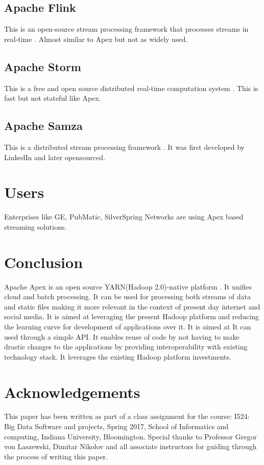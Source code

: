 \documentclass[9pt,twocolumn,twoside]{../../styles/osajnl}
\begin{document}
\subsection{Apache Flink}
This is an open-source stream processing framework that processes streams in real-time \cite{www-apacheapexflink}. Almost similar to Apex but not as widely used.
\subsection{Apache Storm}
This is a free and open source distributed real-time computation system \cite{www-apachestormsite}. This is fast but not stateful like Apex.
\subsection{Apache Samza}
This is a distributed stream processing framework \cite{www-apachesamzasite}. It was first developed by LinkedIn and later opensourced.
\section{Users}
Enterprises like GE, PubMatic, SilverSpring Networks are using Apex based streaming solutions. 
\section{Conclusion}
Apache Apex is an open source YARN(Hadoop 2.0)-native platform \cite{www-apacheapexwiki}. It unifies cloud and batch processing. It can be used for processing both streams of data and static files making it more relevant in the context of present day internet and social media. It is aimed at leveraging the present Hadoop platform and reducing the learning curve for development of applications over it. It is aimed at It can used through a simple API. It enables reuse of code by not having to make drastic changes to the applications by providing interoperability with existing technology stack. It leverages the existing Hadoop platform investments.



\section*{Acknowledgements}

This paper has been written as part of a class assignment for the course: 
I524: Big Data Software and projects, Spring 2017, School of Informatics and computing, Indiana University, Bloomington.
Special thanks to Professor Gregor von Laszewski, Dimitar Nikolov and all associate instructors for guiding through the process of writing this paper.




 
\end{document}
